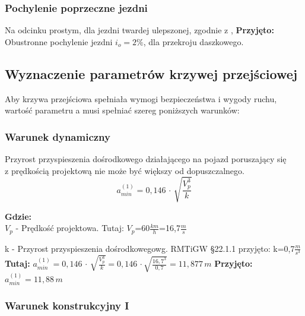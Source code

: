 \documentclass[12pt]{article}
\begin{document}
    	\subsubsection{Pochylenie poprzeczne jezdni}
    		Na odcinku prostym, dla jezdni twardej ulepszonej, zgodnie z \selectfont{RMTiGW §17.2}, 
    		\newline \textbf{Przyjęto:} Obustronne pochylenie jezdni $i_{o}=2\%$, dla przekroju daszkowego.
    		\newpage
    	
    \subsection{Wyznaczenie parametrów krzywej przejściowej}
    	Aby krzywa przejściowa spełniała wymogi bezpieczeństwa i wygody ruchu,\\
    	wartość parametru a musi spełniać szereg poniższych warunków:
    	
    	\subsubsection{Warunek dynamiczny}
    		Przyrost przyspieszenia dośrodkowego działającego na pojazd poruszający się\\
    		z prędkością projektową nie może być większy od dopuszczalnego.
    		\begin{equation}
    		a_{min}^{(1)}=0,146 \,\cdot\, \sqrt{\frac{V_{p}^{3}}{k}}
    		\end{equation}
    		
    		\textbf{Gdzie:}\\
    		$V_{p}$ - Prędkość projektowa. \quad Tutaj: $V_{p}$=60$\frac{km}{h}$=16,7$\frac{m}{s}$
    		
    		k - Przyrost przyspieszenia dośrodkowego\quad wg. RMTiGW §22.1.1 przyjęto:\,\,k=0,7$\frac{m}{s^{3}}$ \newline
            \newline
            \textbf{Tutaj:}
    		\(a_{min}^{(1)}=0,146 \,\cdot\, \sqrt{\frac{V_{p}^{3}}{k}} = 0,146\,\cdot \sqrt{\frac{16,7^{3}}{0,7}}=11,877\,m\)
            \newline \newline
            \textbf{Przyjęto:} \( a^{(1)}_{min}=11,88\,m \)
    	
    	\subsubsection{Warunek konstrukcyjny I}
            
\end{document}
